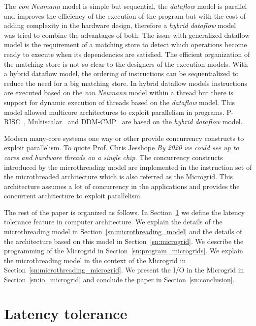 \documentclass{article}
\begin{document}
The \emph{von Neumann} model is simple but sequential, the \emph{dataflow}
model is parallel and improves the efficiency of the execution of the program
but with the cost of adding complexity in the hardware design, therefore a
\emph{hybrid dataflow} model~\cite{5009501,Iannucci:1988:TDN:633625.52416}
was tried to combine the advantages of both. The issue with generalized
dataflow model is the requirement of a matching store to detect which
operations become ready to execute when its dependencies are satisfied. The
efficient organization of the matching store is not so clear to the designers
of the execution models. With a hybrid dataflow model, the ordering of
instructions can be sequentialized to reduce the need for a big matching store.
In hybrid dataflow models instructions are executed based on the \emph{von
Neumann} model within a thread but there is support for dynamic execution of
threads based on the \emph{dataflow} model. This model allowed multicore
architectures to exploit parallelism in programs.
P-RISC~\cite{Razdan:1994:PSA:645462.655024},
Multiscalar~\cite{Sohi:1995:MP:225830.224451} and
DDM-CMP~\cite{stavrou:ddm-cmp:} are based on the \emph{hybrid dataflow}
model.

Modern many-core systems one way or other provide concurrency constructs to
exploit parallelism. To quote Prof. Chris Jesshope \emph{By 2020 we could see
up to  cores and  hardware threads on a single chip}. The
concurrency constructs introduced by the microthreading model are implemented
in the instruction set of the microthreaded architecture which is also referred
as the Microgrid. This architecture assumes a lot of concurrency in the
applications and provides the concurrent architecture to exploit parallelism.


The rest of the paper is organized as follows. In Section~\ref{sn:latency_tolerance}
we define the latency tolerance feature in computer architecture. We explain
the details of the microthreading model in Section~\ref{sn:microthreading_model} and
the details of the architecture based on this model in Section~\ref{sn:microgrid}. We
describe the programming of the Microgrid in Section~\ref{sn:program_microgrids}. We
explain the microthreading model in the context of the Microgrid
in Section~\ref{sn:microthreading_microgrid}. 
We present the I/O in the Microgrid in Section~\ref{sn:io_microgrid} and conclude the
paper in Section~\ref{sn:conclusion}.

\section{Latency tolerance}\label{sn:latency_tolerance}
\end{document}
